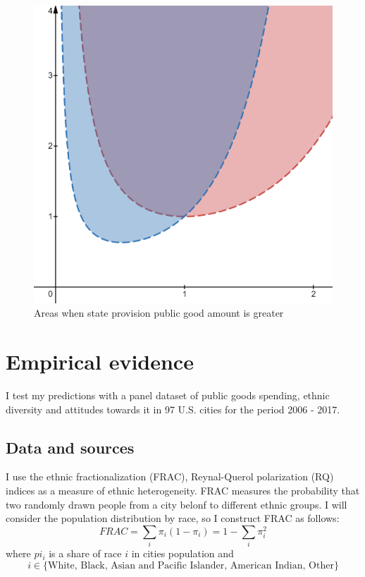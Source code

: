 \documentclass[letterpaper,11pt]{article}
\begin{document}
\begin{figure}[h]
    \centering
    \includegraphics[scale = 0.4]{Thesis/Econometrics US/Parameters.png}
    \caption{Areas when state provision public good amount is greater}
    \label{fig:param}
\end{figure}


\section{Empirical evidence}

I test my predictions with a panel dataset of
public goods spending, ethnic diversity and attitudes towards it in 97  U.S. cities for the period 2006 - 2017.

\subsection{Data and sources}

I use the ethnic fractionalization (FRAC), Reynal-Querol polarization (RQ) indices as a measure of ethnic heterogeneity. FRAC measures the probability that two randomly drawn people from a city belonf to different ethnic groups. I will consider the population distribution by race, so I construct FRAC as follows:
\begin{equation}
    FRAC = \sum_{i} \pi_i (1 - \pi_i) = 1 - \sum_{i}\pi_i^2
\end{equation}
where $pi_i$ is a share of race $i$ in cities population and
\[ i \in \{\text{White, Black, Asian and Pacific Islander, American Indian, Other} \} \]
\end{document}

